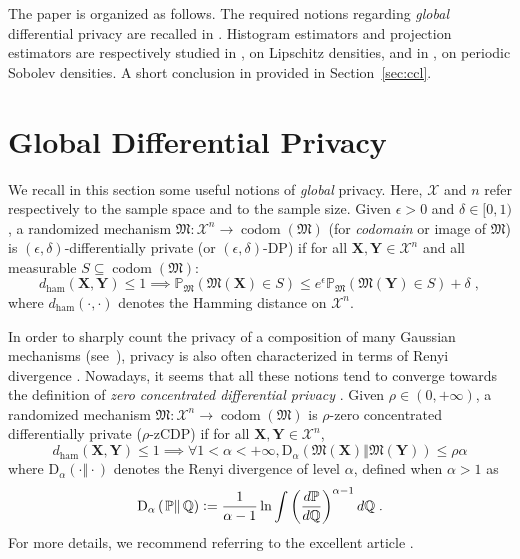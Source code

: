 \documentclass[10pt]{article} %
\newcommand{\Prob}[0]{\mathbb{P}}
\newcommand{\eqdef}{\vcentcolon=}
\newcommand\mech[1]{\mathfrak{#1}}
\newcommand\set[1]{\mathcal{#1}}
\newcommand\vect[1]{\mathbf{#1}}
\newcommand\codom[1]{\operatorname{codom}\left({#1}\right)}
\newcommand\renyi[3]{\text{D}_{#1}\left( \left. {#2}\right\Vert {#3} \right)}
\newcommand\ham[2]{d_\mathrm{ham}\left( {#1}, {#2} \right)}
\newcommand\p[1]{\left( {#1}\right)}
\begin{document}

The paper is organized as follows. 
The required notions regarding \emph{global} differential privacy are recalled in . Histogram estimators and projection estimators are respectively studied in , on Lipschitz densities, and in , on periodic Sobolev densities. A short conclusion in provided in Section~\ref{sec:ccl}.

\section{Global Differential Privacy}
\label{sec:reminders}
We recall in this section some useful notions of \emph{global} privacy.
Here, $\set{X}$ and $n$ refer respectively to the sample space and to the sample size.
Given $\epsilon > 0$ and $\delta \in [0, 1)$, a randomized mechanism $\mech{M} : \set{X}^n \rightarrow \codom{\mech{M}}$ (for \emph{codomain} or image of $\mech{M}$) is $(\epsilon, \delta)$-differentially private (or $(\epsilon, \delta)$-DP) \citep{dwork2006calibrating,dwork2006our} if for all $\vect{X}, \vect{Y} \in \set{X}^n$ and all measurable $S \subseteq \codom{\mech{M}}$:
\begin{equation}
\label{eq:defdp}
    \ham{\vect{X}}{\vect{Y}} \leq 1 \implies \Prob_{\mech{M}}\p{\mech{M}(\vect{X}) \in S} \leq e^\epsilon \Prob_{\mech{M}}\p{\mech{M}(\vect{Y}) \in S} + \delta \;,
\end{equation}
where $\ham{\cdot}{\cdot}$ denotes the Hamming distance on $\set{X}^n$. 

In order to sharply count the privacy of a composition of many Gaussian mechanisms (see~\citet{abadi2016deep}), privacy is also often characterized in terms of Renyi divergence \citep{mironov2017renyi}. Nowadays, it seems that all these notions tend to converge towards the definition of \emph{zero concentrated differential privacy} \citep{dwork2016concentrated,bun2016concentrated}. Given $\rho \in (0, +\infty)$, a randomized mechanism $\mech{M} : \set{X}^n \rightarrow \codom{\mech{M}}$ is $\rho$-zero concentrated differentially private ($\rho$-zCDP) if for all $\vect{X}, \vect{Y} \in \set{X}^n$, %
\begin{equation}
\label{eq:defcdp}
    \ham{\vect{X}}{\vect{Y}} \leq 1 \implies   \forall 1 < \alpha < +\infty, \renyi{\alpha}{\mech{M}(\vect{X})}{\mech{M}(\vect{Y})} \leq \rho \alpha 
\end{equation}
where $\renyi{\alpha}{\cdot}{\cdot}$ denotes the Renyi divergence of level $\alpha$, defined when $\alpha>1$ as 
\begin{equation*}
    \renyi{\alpha}{\mathbb{P}}{\mathbb{Q}} \eqdef \frac{1}{\alpha - 1} \ln \int  \p{\frac{d \mathbb{P}}{ d \mathbb{Q}}}^{\alpha - 1} d \mathbb{Q} \;.
\end{equation*}
For more details, we recommend referring to the excellent article \citet{van2014renyi}.
\end{document}
